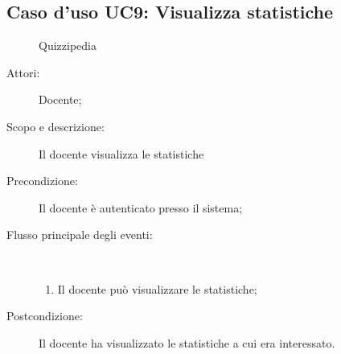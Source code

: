 \subsection{Caso d'uso UC9: Visualizza statistiche}
	\begin{figure}[H]
		\centering
		\begin{resizedtikzpicture}{\textwidth}
		\begin{umlsystem}[x=0, fill=lightgray!20]{Quizzipedia}
		\end{umlsystem}
		\end{resizedtikzpicture}
		\caption{}
	\end{figure}
\begin{description}
\item[Attori:] Docente;
\item[Scopo e descrizione:] Il docente visualizza le statistiche
      \item[Precondizione:] Il docente è autenticato presso il sistema;

        \item[Flusso principale degli eventi:] \ 
 \begin{enumerate}
          \item Il docente può visualizzare le statistiche;

      \end{enumerate}
    \item[Postcondizione:] Il docente ha visualizzato le statistiche a cui era interessato.
  \end{description}
\hypertarget{UC10}{}
